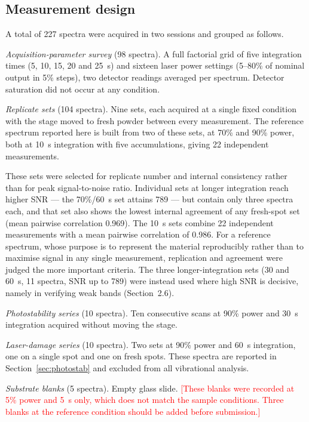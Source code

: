 \documentclass[11pt,a4paper]{article}
\newcommand{\authorcheck}[1]{\textcolor{red}{[#1]}}
\begin{document}
\subsection{Measurement design}

A total of 227 spectra were acquired in two sessions and grouped as follows.

\emph{Acquisition-parameter survey} (98 spectra). A full factorial grid of five
integration times (5, 10, 15, 20 and 25~s) and sixteen laser power settings
(5--80\% of nominal output in 5\% steps), two detector readings averaged per
spectrum. Detector saturation did not occur at any condition.

\emph{Replicate sets} (104 spectra). Nine sets, each acquired at a single fixed
condition with the stage moved to fresh powder between every measurement. The
reference spectrum reported here is built from two of these sets, at 70\% and
90\% power, both at 10~s integration with five accumulations, giving 22
independent measurements.

These sets were selected for replicate number and internal consistency rather
than for peak signal-to-noise ratio. Individual sets at longer integration reach
higher SNR --- the 70\%/60~s set attains 789 --- but contain only three spectra
each, and that set also shows the lowest internal agreement of any fresh-spot
set (mean pairwise correlation 0.969). The 10~s sets combine 22 independent
measurements with a mean pairwise correlation of 0.986. For a reference spectrum,
whose purpose is to represent the material reproducibly rather than to maximise
signal in any single measurement, replication and agreement were judged the more
important criteria. The three longer-integration sets (30 and 60~s, 11 spectra,
SNR up to 789) were instead used where high SNR is decisive, namely in verifying
weak bands (Section~2.6).

\emph{Photostability series} (10 spectra). Ten consecutive scans at 90\% power
and 30~s integration acquired without moving the stage.

\emph{Laser-damage series} (10 spectra). Two sets at 90\% power and 60~s
integration, one on a single spot and one on fresh spots. These spectra are
reported in Section~\ref{sec:photostab} and excluded from all vibrational
analysis.

\emph{Substrate blanks} (5 spectra). Empty glass slide.
\authorcheck{These blanks were recorded at 5\% power and 5~s only, which does
not match the sample conditions. Three blanks at the reference condition should
be added before submission.}
\end{document}
